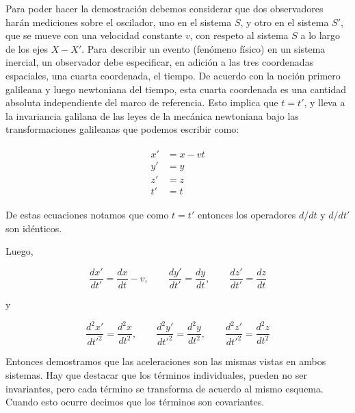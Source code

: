 \documentclass[a4paper,10pt]{article}
\numberwithin{equation}{section}
\begin{document}
Para poder hacer la demostración debemos considerar que dos observadores harán mediciones
sobre el oscilador, uno en el sistema $S$, y otro en el sistema $S'$, que se mueve
con una velocidad constante $v$, con respeto al sistema $S$ a lo largo de los ejes $X-X'$. Para 
describir un evento (fenómeno físico) en un sistema inercial, un observador debe especificar,
en adición a las tres coordenadas espaciales, una cuarta coordenada, el tiempo. De acuerdo
con la noción primero galileana y luego newtoniana del tiempo, esta cuarta coordenada
es una cantidad absoluta independiente del marco de referencia. Esto implica que $t=t'$, y lleva 
a la invariancia galilana de las leyes de la mecánica newtoniana bajo las transformaciones 
galileanas que podemos escribir como:

\begin{align}
 \begin{split}
  x' &= x - vt \\
  y' &= y \\
  z' &= z \\
  t' &= t
 \end{split}
\end{align}

De estas ecuaciones notamos que como $t=t'$ entonces los operadores $d/dt$ y $d/dt'$ son 
idénticos.

\vspace{.3cm}

Luego,

\begin{equation}
 \frac{dx'}{dt'} = \frac{dx}{dt} - v, \qquad \frac{dy'}{dt'} = \frac{dy}{dt}, \qquad
  \frac{dz'}{dt'} = \frac{dz}{dt}
\end{equation}

y

\begin{equation}
 \frac{d^2x'}{dt'^2} = \frac{d^2x}{dt^2}, \qquad  \frac{d^2y'}{dt'^2} = \frac{d^2y}{dt^2}, \qquad
 \frac{d^2z'}{dt'^2} = \frac{d^2z}{dt^2}
 \label{eq:galileito}
\end{equation}

\vspace{.2cm}

Entonces demostramos que las aceleraciones son las mismas vistas en ambos sistemas. Hay que
destacar que los términos individuales, pueden no ser invariantes, pero cada término
se transforma de acuerdo al mismo esquema. Cuando esto ocurre decimos que los términos 
son covariantes.

\vspace{.3cm}
\end{document}
